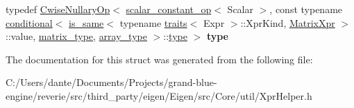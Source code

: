 \begin{DoxyCompactItemize}
\item 
\mbox{\label{struct_eigen_1_1internal_1_1plain__constant__type_a728ab570c978a7e36928c8790bd4d4f6}} 
typedef \mbox{\hyperlink{class_eigen_1_1_cwise_nullary_op}{Cwise\+Nullary\+Op}}$<$ \mbox{\hyperlink{struct_eigen_1_1internal_1_1scalar__constant__op}{scalar\+\_\+constant\+\_\+op}}$<$ Scalar $>$, const typename \mbox{\hyperlink{struct_eigen_1_1internal_1_1conditional}{conditional}}$<$ \mbox{\hyperlink{struct_eigen_1_1internal_1_1is__same}{is\+\_\+same}}$<$ typename \mbox{\hyperlink{struct_eigen_1_1internal_1_1traits}{traits}}$<$ Expr $>$\+::Xpr\+Kind, \mbox{\hyperlink{struct_eigen_1_1_matrix_xpr}{Matrix\+Xpr}} $>$\+::value, \mbox{\hyperlink{class_eigen_1_1_matrix}{matrix\+\_\+type}}, \mbox{\hyperlink{class_eigen_1_1_array}{array\+\_\+type}} $>$\+::\mbox{\hyperlink{class_eigen_1_1_cwise_nullary_op}{type}} $>$ {\bfseries type}
\end{DoxyCompactItemize}


The documentation for this struct was generated from the following file\+:\begin{DoxyCompactItemize}
\item 
C\+:/\+Users/dante/\+Documents/\+Projects/grand-\/blue-\/engine/reverie/src/third\+\_\+party/eigen/\+Eigen/src/\+Core/util/Xpr\+Helper.\+h\end{DoxyCompactItemize}
